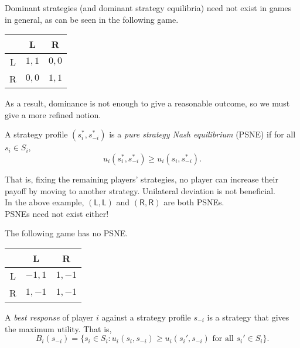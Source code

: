 	Dominant strategies (and dominant strategy equilibria) need not exist in games in general, as can be seen in the following game.

	\begin{center}
	\begin{tabular}{|c||c|c|}
		\hline
		& \textsf{L} & \textsf{R} \\
		\hline\hline
		\textsf{L} & $1, 1$ & $0,0$ \\
		\hline
		\textsf{R} & $0,0$ & $1,1$ \\
		\hline 
	\end{tabular}
	\end{center}

	As a result, dominance is not enough to give a reasonable outcome, so we must give a more refined notion.

	\begin{fdef}
		A strategy profile $(s_i^*,s_{-i}^*)$ is a \emph{pure strategy Nash equilibrium} (PSNE) if for all $s_i \in S_i$,
		\[ u_i(s_i^*, s_{-i}^*) \ge u_i(s_i,s_{-i}^*). \]
	\end{fdef}

	That is, fixing the remaining players' strategies, no player can increase their payoff by moving to another strategy. Unilateral deviation is not beneficial. \\
	In the above example, $(\mathsf{L},\mathsf{L})$ and $(\mathsf{R},\mathsf{R})$ are both PSNEs.\\
	PSNEs need not exist either!

	\begin{fex}
		The following game has no PSNE.
		\begin{center}
		\begin{tabular}{|c||c|c|}
			\hline
			& \textsf{L} & \textsf{R} \\
			\hline\hline
			\textsf{L} & $-1,1$ & $1,-1$ \\
			\hline
			\textsf{R} & $1,-1$ & $1,-1$ \\ \hline
		\end{tabular}
		\end{center}
	\end{fex}

	\begin{fdef}
		A \emph{best response} of player $i$ against a strategy profile $s_{-i}$ is a strategy that gives the maximum utility. That is,
		\[ B_i(s_{-i}) = \{ s_i \in S_i : u_i(s_i,s_{-i}) \ge u_i(s_i',s_{-i}) \text{ for all $s_i' \in S_i$} \}. \]
	\end{fdef}

